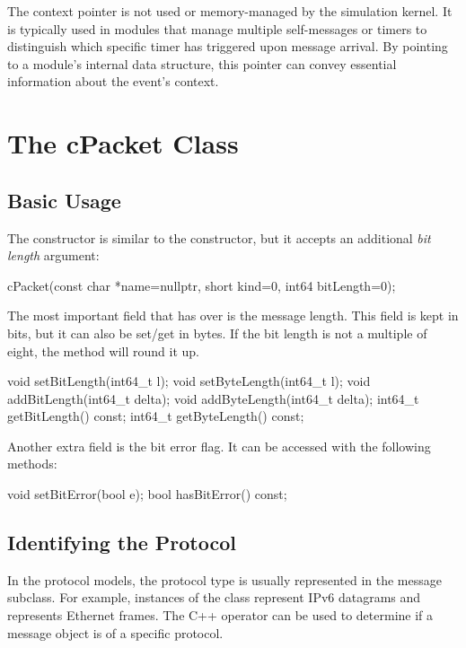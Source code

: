 The context pointer is not used or memory-managed by the simulation kernel. It
is typically used in modules that manage multiple self-messages or timers to
distinguish which specific timer has triggered upon message arrival. By pointing
to a module's internal data structure, this pointer can convey essential
information about the event's context.


\section{The cPacket Class}
\label{sec:msgs:cpacket}

\subsection{Basic Usage}
\label{sec:messages:cpacket-basic-usage}

The  constructor is similar to the 
constructor, but it accepts an additional \textit{bit length} argument:

\begin{cpp}
cPacket(const char *name=nullptr, short kind=0, int64 bitLength=0);
\end{cpp}

The most important field that  has over  is
the message length. This field is kept in bits, but it can also be
set/get in bytes. If the bit length is not a multiple of eight, the
 method will round it up.

\begin{cpp}
void setBitLength(int64_t l);
void setByteLength(int64_t l);
void addBitLength(int64_t delta);
void addByteLength(int64_t delta);
int64_t getBitLength() const;
int64_t getByteLength() const;
\end{cpp}

Another extra field is the bit error flag. It can be accessed with the
following methods:

\begin{cpp}
void setBitError(bool e);
bool hasBitError() const;
\end{cpp}


\subsection{Identifying the Protocol}
\label{sec:messages:identifying-protocol-of-packet}

In the {\opp} protocol models, the protocol type is usually represented in the
message subclass. For example, instances of the 
class represent IPv6 datagrams and  represents Ethernet
frames. The C++  operator can be used to determine if a
message object is of a specific protocol.

